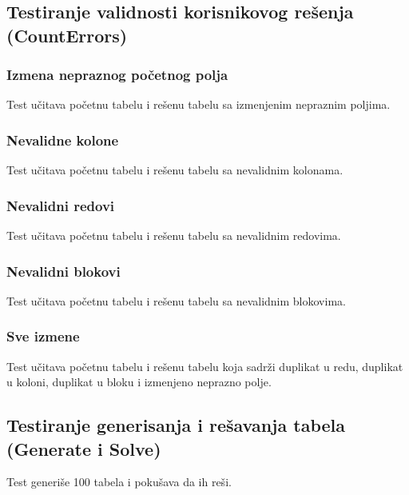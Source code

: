 \documentclass[a4paper]{article}
\begin{document}
    \subsection{Testiranje validnosti korisnikovog rešenja (CountErrors)}
    \subsubsection{Izmena nepraznog početnog polja}
    Test učitava početnu tabelu i rešenu tabelu sa izmenjenim nepraznim poljima. 
    \subsubsection{Nevalidne kolone}
    Test učitava početnu tabelu i rešenu tabelu sa nevalidnim kolonama. 
    \subsubsection{Nevalidni redovi}
    Test učitava početnu tabelu i rešenu tabelu sa nevalidnim redovima.
    \subsubsection{Nevalidni blokovi}
    Test učitava početnu tabelu i rešenu tabelu sa nevalidnim blokovima.
    \subsubsection{Sve izmene}
    Test učitava početnu tabelu i rešenu tabelu koja sadrži duplikat u redu, duplikat u koloni, duplikat u bloku i izmenjeno neprazno polje.
    \subsection{Testiranje generisanja i rešavanja tabela (Generate i Solve)}
    Test generiše 100 tabela i pokušava da ih reši.

    \newpage
\end{document}

